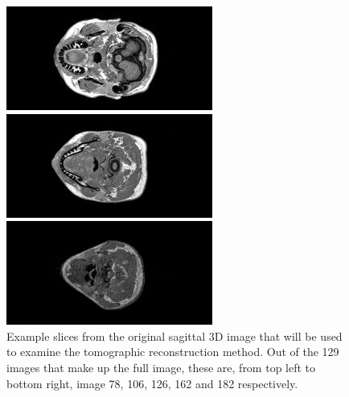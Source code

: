 \begin{figure}[ht]
        \begin{minipage}[c]{0.3\linewidth}
            \centering
            \includegraphics[width=\textwidth]{Files/report_images/axial_example4.jpg}
        \end{minipage}
        \begin{minipage}[c]{0.3\linewidth}
            \centering
            \includegraphics[width=\textwidth]{Files/report_images/axial_example5.jpg}
        \end{minipage}
        \begin{minipage}[c]{0.3\linewidth}
            \centering
            \includegraphics[width=\textwidth]{Files/report_images/axial_example6.jpg}
        \end{minipage}
        \caption{Example slices from the original sagittal 3D image that will be used to examine the tomographic reconstruction method. Out of the 129 images that make up the full image, these are, from top left to bottom right, image 78, 106, 126, 162 and 182 respectively.\label{fig:example_axial}}
    \end{figure}

